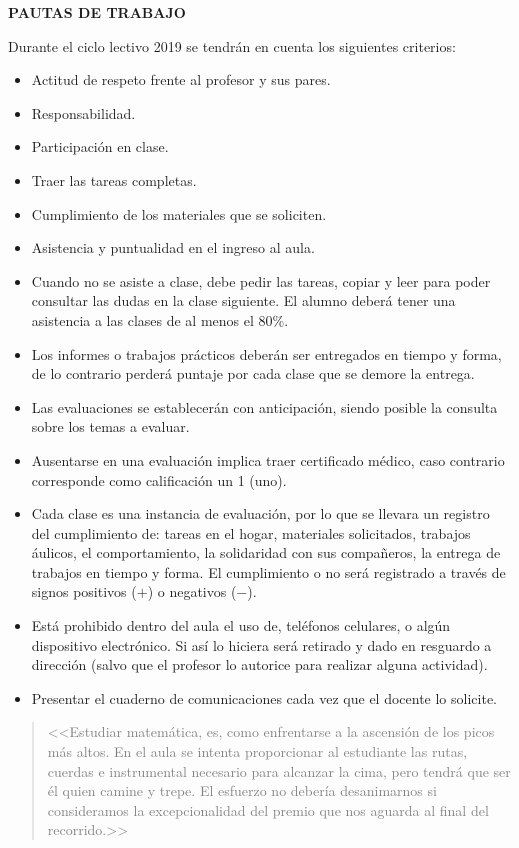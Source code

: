 \documentclass[12pt]{article}
\newcommand{\comment}[1]{\textcolor{gray!90}{#1}}
\begin{document}
\begin{center}
    \textbf{PAUTAS DE TRABAJO}
\end{center}

Durante el ciclo lectivo 2019 se tendrán en cuenta los siguientes criterios:
\begin{itemize}
    \item Actitud de respeto frente al profesor y sus pares.
    \item Responsabilidad.
    \item Participación en clase.
    \item Traer las tareas completas.
    \item Cumplimiento de los materiales que se soliciten.
    \item Asistencia y puntualidad en el ingreso al aula.
    \item Cuando no se asiste a clase, debe pedir las tareas, copiar y leer para poder consultar las dudas en la clase siguiente. El alumno deberá tener una asistencia a las clases de al menos el 80\%.
    \item Los informes o trabajos prácticos deberán ser entregados en tiempo y forma, de lo contrario perderá puntaje por cada clase que se demore la entrega.
    \item Las evaluaciones se establecerán con anticipación, siendo posible la consulta sobre los temas a evaluar.
    \item Ausentarse en una evaluación implica traer certificado médico, caso contrario corresponde como calificación un 1 (uno).
    \item Cada clase es una instancia de evaluación, por lo que se llevara un registro del cumplimiento de: tareas en el hogar, materiales solicitados, trabajos áulicos, el comportamiento, la solidaridad con sus compañeros, la entrega de trabajos en tiempo y forma. El cumplimiento o no será registrado a través de signos positivos ($+$) o negativos ($-$).
    \item Está prohibido dentro del aula el uso de, teléfonos celulares, o algún dispositivo electrónico. Si así lo hiciera será retirado y dado en resguardo a dirección (salvo que el profesor lo autorice para realizar alguna actividad).
    \item Presentar el cuaderno de comunicaciones cada vez que el docente lo solicite.
\end{itemize}


\medskip 
\begin{quote}
\large\textcolor{gray}{
<<Estudiar matemática, es, como enfrentarse a la ascensión de los picos más altos. En el aula se intenta proporcionar al estudiante las rutas, cuerdas e instrumental necesario para alcanzar la cima, pero tendrá que ser él quien camine y trepe. El esfuerzo no debería desanimarnos si consideramos la excepcionalidad del premio que nos aguarda al final del recorrido.>>
}
\end{quote}
\end{document}
